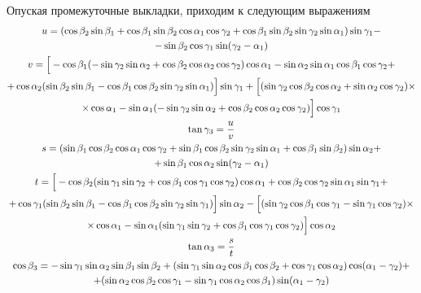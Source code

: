 \documentclass[14pt]{extarticle}
\newcommand{\ao}{\alpha_1}
\newcommand{\bo}{\beta_1}
\newcommand{\go}{\gamma_1}
\newcommand{\at}{\alpha_2}
\newcommand{\bt}{\beta_2}
\newcommand{\gt}{\gamma_2}
\newcommand{\ath}{\alpha_3}
\newcommand{\bth}{\beta_3}
\newcommand{\gth}{\gamma_3}
\begin{document}
Опуская промежуточные выкладки, приходим к следующим выражениям
\begin{gather}
	u = (\cos \bt \sin \bo + \cos \bo \sin \bt \cos \ao \cos \gt + \cos \bo \sin \bt \sin \gt \sin \ao) \sin \go - \notag \\
	- \sin \bt \cos \go \sin(\gt - \ao) \notag \\
	v = \Big[ - \cos \bo (-\sin \gt \sin \at + \cos \bt \cos \at \cos \gt) \cos \ao - \sin \at \sin \ao \cos \bo \cos \gt +  \notag \\ 
	+ \cos \at (\sin \bt \sin \bo - \cos \bo \cos \bt \sin \gt \sin \ao ) \Big] \sin \go + \Big[ (\sin \gt \cos \bt \cos \at + \sin \at \cos \gt) \times \notag \\
	\times \cos \ao - \sin \ao ( - \sin \gt \sin \at + \cos \bt \cos \at \cos \gt) \Big] \cos \go \notag \\
	\tan \gth = \frac{u}{v} \notag \\
	s = ( \sin \bo \cos \bt \cos \ao \cos \gt + \sin \bo \cos \bt \sin \gt \sin \ao + \cos \bo \sin \bt ) \sin \at + \notag \\ 
	+ \sin \bo \cos \at \sin ( \gt - \ao ) \notag \\
	t = \Big[ -\cos \bt ( \sin \go \sin \gt + \cos \bo \cos \go \cos \gt ) \cos \ao + \cos \bt \cos \gt \sin \ao \sin \go + \notag \\
	+ \cos \go ( \sin \bt \sin \bo - \cos \bo \cos \bt \sin \gt \sin \go) \Big] \sin \at - \Big[ ( \sin \gt \cos \bo \cos \go - \sin \go \cos \gt ) \times \notag \\
	\times \cos \ao - \sin \ao ( \sin \go \sin \gt + \cos \bo \cos \go \cos \gt ) \Big] \cos \at \notag \\
	\tan \ath = \frac{s}{t} \notag \\
	\cos \bth = - \sin \go \sin \at \sin \bo \sin \bt + (\sin \go \sin \at \cos \bo \cos \bt + \cos \go \cos \at) \cos (\ao - \gt) + \notag \\
	+ (\sin \at \cos \bt \cos \go - \sin \go \cos \at \cos \bo) \sin (\ao - \gt) \notag
\end{gather}
\end{document}
